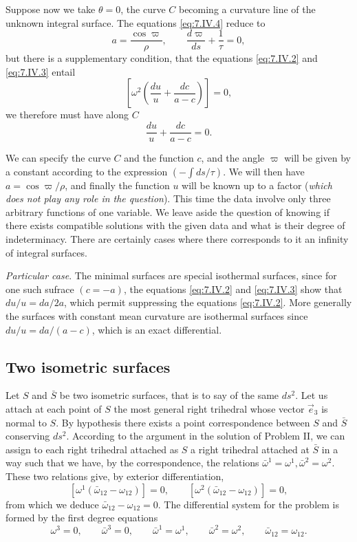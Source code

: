 \documentclass[leqno,11pt]{book}
\numberwithin{equation}{chapter}
\theoremstyle{shape1}
\theoremstyle{shape0}
\theoremstyle{shape2}
\theoremstyle{definition}
\begin{document}
Suppose now we take $\theta=0$, the curve $C$ becoming a curvature line of the unknown integral surface. The equations \eqref{eq:7.IV.4} reduce to
\[
a=\frac{\cos\varpi}{\rho},\qquad\frac{d\varpi}{ds}+\frac{1}{\tau}=0,
\]
but there is a supplementary condition, that the equations \eqref{eq:7.IV.2} and \eqref{eq:7.IV.3} entail
\[
\left[\omega^{2}\left(\frac{du}{u}+\frac{dc}{a-c}\right)\right]=0,
\]
we therefore must have along $C$
\[
\frac{du}{u}+\frac{dc}{a-c}=0.
\]

We can specify the curve $C$ and the function $c$, and the angle $\varpi$ will be given by a constant according to the expression  $(-\int ds/\tau)$. We will then have $a=\cos\varpi/\rho$, and finally the function $u$ will be known up to a factor (\emph{which does not play any role in the question}). This time the data involve only three arbitrary functions of one variable. We leave aside the question of knowing if there exists compatible solutions with the given data and what is their degree of indeterminacy. There are certainly cases where there corresponds to it an infinity of integral surfaces.

\emph{Particular case}. The minimal surfaces are special isothermal surfaces, since for one such sufrace $(c=-a)$, the equations \eqref{eq:7.IV.2} and \eqref{eq:7.IV.3} show that $du/u=da/2a$, which permit suppressing the equations \eqref{eq:7.IV.2}. More generally the surfaces with constant mean curvature are isothermal surfaces since $du/u=da/(a-c)$, which is an exact differential.


\subsection{Two isometric surfaces}
\label{sec:some-isoth-surf}

\fsec Let $S$ and $\bar S$ be two isometric surfaces, that is to say of the same $ds^{2}$. Let us attach at each point of $S$ the most general right trihedral whose vector $\vec e_{3}$ is normal to $S$. By hypothesis there exists a point correspondence between $S$ and $\bar S$ conserving $ds^{2}$. According to the argument in the solution of Problem II, we can assign to each right trihedral attached as $S$ a right trihedral attached at $\bar S$ in a way such that we have, by the correspondence, the relations $\bar\omega^{1}=\omega^{1},\bar\omega^{2}=\omega^{2}$. These two relations give, by exterior differentiation,
\[
[\omega^{1}(\bar\omega_{12}-\omega_{12})]=0,\qquad[\omega^{2}(\bar\omega_{12}-\omega_{12})]=0,
\]
from which we deduce $\bar\omega_{12}-\omega_{12}=0$. The differential system for the problem is formed by the first degree equations
\begin{equation}
  \label{eq:7.V.1}\tag{V, 1}
  \omega^{3}=0,\qquad\bar\omega^{3}=0,\qquad\bar\omega^{1}=\omega^{1},\qquad\bar\omega^{2}=\omega^{2},\qquad\bar\omega_{12}=\omega_{12}.
\end{equation}
\end{document}
